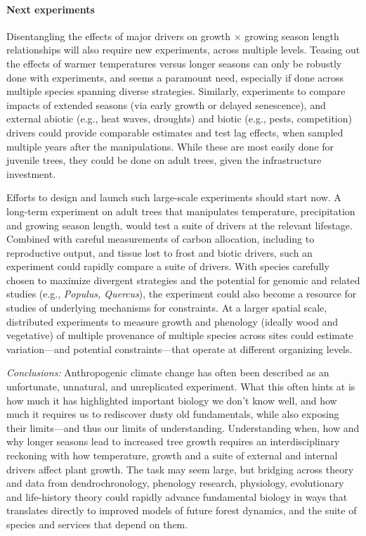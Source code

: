 \documentclass[11pt]{article}
\begin{document}
\paragraph{Next experiments}

Disentangling the effects of major drivers on growth $\times$ growing season length relationships will also require new experiments, across multiple levels. Teasing out the effects of warmer temperatures versus longer seasons can only be robustly done with experiments, and seems a paramount need, especially if done across multiple species spanning diverse strategies. Similarly, experiments to compare impacts of extended seasons (via early growth or delayed senescence), and external abiotic (e.g., heat waves, droughts) and biotic (e.g., pests, competition) drivers could provide comparable estimates and test lag effects, when sampled multiple years after the manipulations. While these are most easily done for juvenile trees, they could be done on adult trees, given the infrastructure investment. %

Efforts to design and launch such large-scale experiments should start now. A long-term experiment on adult trees that manipulates temperature, precipitation and growing season length, would test a suite of drivers at the relevant lifestage. Combined with careful measurements of carbon allocation, including to reproductive output, and tissue lost to frost and biotic drivers, such an experiment could rapidly compare a suite of drivers. With species carefully chosen to maximize divergent strategies and the potential for genomic and related studies (e.g., \emph{Populus, Quercus}), the experiment could also become a resource for studies of underlying mechanisms for constraints. At a larger spatial scale, distributed experiments to measure growth and phenology (ideally wood and vegetative) of multiple provenance of multiple species across sites could estimate variation---and potential constraints---that operate at different organizing levels. 

\emph{Conclusions:}
Anthropogenic climate change has often been described as an unfortunate, unnatural, and unreplicated experiment. What this often hints at is how much it has highlighted important biology we don't know well, and how much it requires us to rediscover dusty old fundamentals, while also exposing their limits---and thus our limits of understanding. Understanding when, how and why longer seasons lead to increased tree growth requires an interdisciplinary reckoning with how temperature, growth and a suite of external and internal drivers affect plant growth. The task may seem large, but bridging across theory and data from dendrochronology, phenology research, physiology, evolutionary and life-history theory could rapidly advance fundamental biology in ways that translates directly to improved models of future forest dynamics, and the suite of species and services that depend on them. %
\end{document}

